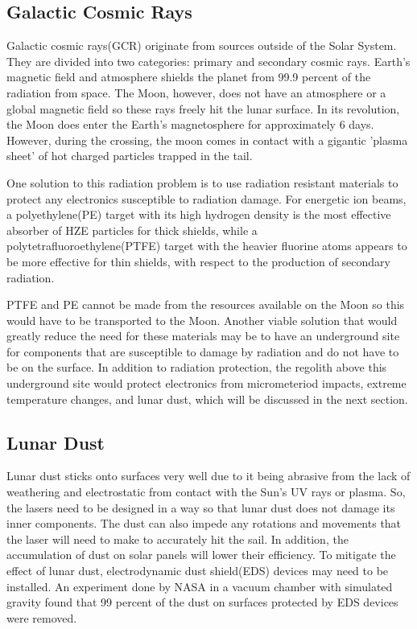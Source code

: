 \documentclass{aa}
\begin{document}
\subsection {Galactic Cosmic Rays}
Galactic cosmic rays(GCR) originate from sources outside of the Solar System. They are divided into two categories: primary and secondary cosmic rays. Earth's magnetic field and atmosphere shields the planet from 99.9 percent of the radiation from space. The Moon, however, does not have an atmosphere or a global magnetic field so these rays freely hit the lunar surface. In its revolution, the Moon does enter the Earth's magnetosphere for approximately 6 days. However, during the crossing, the moon comes in contact with a gigantic 'plasma sheet' of hot charged particles trapped in the tail.

One solution to this radiation problem is to use radiation resistant materials to protect any electronics susceptible to radiation damage. For energetic ion beams, a polyethylene(PE) target with its high hydrogen density is the most effective absorber of HZE particles for thick shields, while a polytetrafluoroethylene(PTFE) target with the heavier fluorine atoms appears to be more effective for thin shields, with respect to the production of secondary radiation. 

PTFE and PE cannot be made from the resources available on the Moon so this would have to be transported to the Moon. Another viable solution that would greatly reduce the need for these materials may be to have an underground site for components that are susceptible to damage by radiation and do not have to be on the surface. In addition to radiation protection, the regolith above this underground site would protect electronics from micrometeriod impacts, extreme temperature changes, and lunar dust, which will be discussed in the next section.
\subsection {Lunar Dust}
Lunar dust sticks onto surfaces very well due to it being abrasive from the lack of weathering and electrostatic from contact with the Sun's UV rays or plasma. So, the lasers need to be designed in a way so that lunar dust does not damage its inner components.  The dust can also impede any rotations and movements that the laser will need to make to accurately hit the sail. In addition, the accumulation of dust on solar panels will lower their efficiency.  To mitigate the effect of lunar dust, electrodynamic dust shield(EDS) devices may need to be installed. An experiment done by NASA in a vacuum chamber with simulated gravity found that 99 percent of the dust on surfaces protected by EDS devices were removed.
\end{document}
